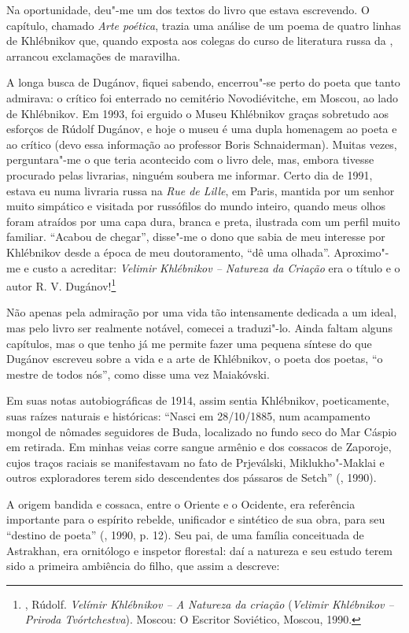 Na oportunidade, deu"-me um dos textos do livro que estava escrevendo. O
capítulo, chamado \emph{Arte poética}, trazia uma análise de um poema
de quatro linhas de Khlébnikov que, quando exposta aos colegas do curso
de literatura russa da , arrancou exclamações de maravilha.

A longa busca de Dugánov, fiquei sabendo, encerrou"-se perto do poeta que
tanto admirava: o crítico foi enterrado no cemitério Novodiévitche, em
Moscou, ao lado de Khlébnikov. Em 1993, foi erguido o Museu
Khlébnikov graças sobretudo aos esforços de Rúdolf Dugánov, e hoje o museu é uma
dupla homenagem ao poeta e ao crítico (devo
essa informação ao professor Boris Schnaiderman). Muitas vezes,
perguntara"-me o que teria acontecido com o livro dele, mas, embora
tivesse procurado pelas livrarias, ninguém soubera me informar. Certo
dia de 1991, estava eu numa livraria russa na \emph{Rue de Lille}, em Paris,
mantida por um senhor muito simpático e
visitada por russófilos do mundo inteiro, quando meus olhos foram
atraídos por uma capa dura, branca e preta, ilustrada com um perfil muito
familiar. ``Acabou de chegar'', disse"-me o dono que sabia de meu
interesse por Khlébnikov desde a época de meu doutoramento, ``dê uma
olhada''. Aproximo"-me e custo a acreditar: \emph{Velimir Khlébnikov -- Natureza da Criação} era o título e o autor R. V.
Dugánov!\footnote{, Rúdolf. \emph{Velímir Khlébnikov -- A
Natureza da criação} (\emph{Velimir Khlébnikov -- Priroda
Tvórtchestva}). Moscou: O Escritor Soviético, Moscou, 1990.}

Não apenas pela admiração por uma vida tão intensamente dedicada a um
ideal, mas pelo livro ser realmente notável, comecei a traduzi"-lo.
Ainda faltam alguns capítulos, mas o que tenho já me
permite fazer uma pequena síntese do que Dugánov escreveu sobre a
vida e a arte de Khlébnikov, o poeta dos poetas, ``o mestre de
todos nós'', como disse uma vez Maiakóvski.

Em suas notas autobiográficas de 1914, assim sentia Khlébnikov,
poeticamente, suas raízes naturais e históricas: ``Nasci em 28/10/1885,
num acampamento mongol de nômades seguidores de Buda, localizado no
fundo seco do Mar Cáspio em retirada. Em minhas veias corre sangue
armênio e dos cossacos de Zaporoje, cujos traços raciais se manifestavam
no fato de Prjeválski, Miklukho"-Maklai e outros exploradores terem sido
descendentes dos pássaros de Setch'' (, 1990).

A origem bandida e cossaca, entre o Oriente e o Ocidente,
era referência importante para o espírito rebelde, unificador e
sintético de sua obra, para seu ``destino de poeta'' (, 1990, p. 12). Seu pai, de uma
família conceituada de Astrakhan, era ornitólogo e inspetor florestal:
daí a natureza e seu estudo terem sido a primeira ambiência do filho,
que assim a descreve:

